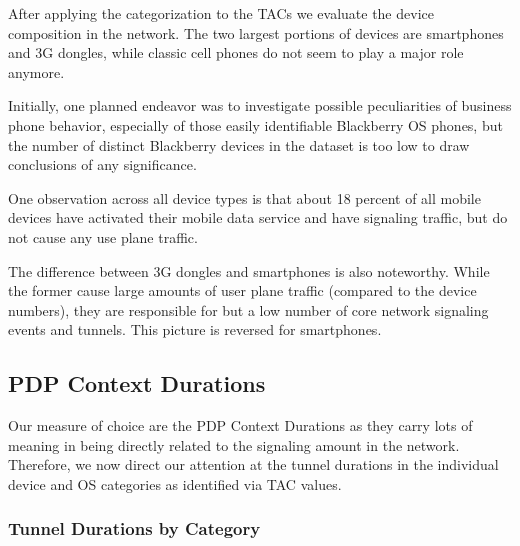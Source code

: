 After applying the categorization to the \acp{TAC} we evaluate the device composition in the network. The two largest portions of devices are smartphones  and 3G dongles, while classic cell phones do not seem to play a major role anymore. 


Initially, one planned endeavor was to investigate possible peculiarities of business phone behavior, especially of those easily identifiable Blackberry OS phones, but the number of distinct Blackberry devices in the dataset is too low to draw conclusions of any significance.

One observation across all device types is that about 18 percent of all mobile devices have activated their mobile data service and have signaling traffic, but do not cause any use plane traffic.

The difference between 3G dongles and smartphones is also noteworthy. While the former cause large amounts of user plane traffic (compared to the device numbers), they are responsible for but a low number of core network signaling events and tunnels. This picture is reversed for smartphones.





\subsection{PDP Context Durations}

Our measure of choice are the PDP Context Durations as they carry lots of meaning in being directly related to the signaling amount in the network. Therefore, we now direct our attention at the tunnel durations in the individual device and OS categories as identified via \ac{TAC} values.


\subsubsection{Tunnel Durations by Category}


